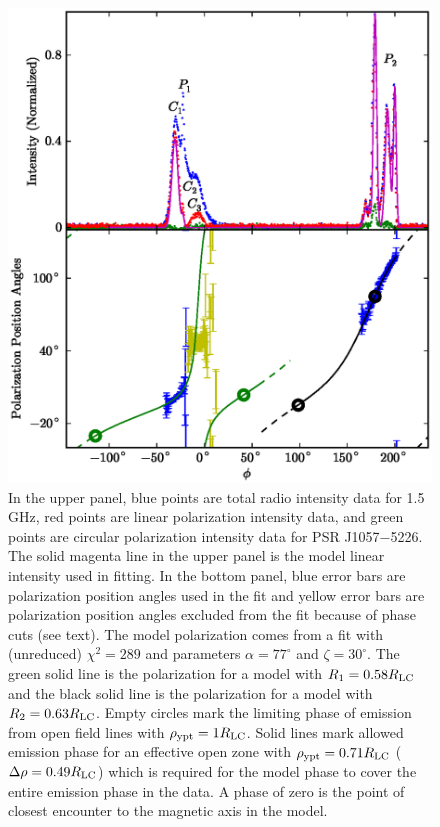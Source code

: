 \begin{figure}[htbp]
\begin{center}
\includegraphics[scale=.8]{chapters/applicationOfNumericalModel/figures/intAndPAJ1057alpha77zeta30.eps}
\caption[Intensity and polarization data for PSR J1057$-$5226 overlaid with model]{\label{fig:PlotJ1057intPA}
In the upper panel, blue points are total radio intensity data for 1.5 GHz, red points are linear polarization intensity data,
and green points are circular polarization intensity data for PSR J1057$-$5226.  The solid magenta line in the upper panel is
the model linear intensity used in fitting.  In the bottom panel, blue error bars are polarization position angles
used in the fit and yellow error bars are polarization position angles excluded from the 
fit because of phase cuts (see text).
The model polarization comes from
a fit with (unreduced) $\chi^2=289$ and parameters $\alpha=77^{\circ}$ and $\zeta=30^{\circ}$.  The green solid line is the polarization for
a model with $R_{1}=0.58R_{\rm{LC}}$ and the black solid line is the polarization for 
a model with $R_{2}=0.63R_{\rm{LC}}$.
Empty circles mark the limiting phase of emission from
open field lines with $\rho_{\rm{ypt}}=1R_{\rm{LC}}$.
Solid lines mark allowed emission phase for an effective open zone with
$\rho_{\rm{ypt}}=0.71R_{\rm{LC}}$ ($\Delta\rho=0.49R_{\rm{LC}}$) which is
required for the model phase to cover the entire emission phase in the data.
A phase of zero is the point
of closest encounter to the magnetic axis in the model.
}
\end{center}
\end{figure}


